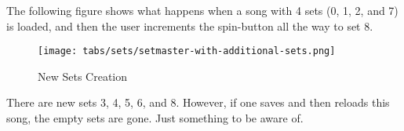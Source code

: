    The following figure shows what happens when a song with 4 sets (0, 1, 2,
   and 7) is loaded, and then the user increments the spin-button all the way
   to set 8.

\begin{figure}[H]
   \centering 
   \texttt{[image: tabs/sets/setmaster-with-additional-sets.png]}
   \caption{New Sets Creation}
   \label{fig:setmaster_set_creation}
\end{figure}

   There are new sets 3, 4, 5, 6, and 8.  However, if one saves and then
   reloads this song, the empty sets are gone.  Just something to be aware of.

